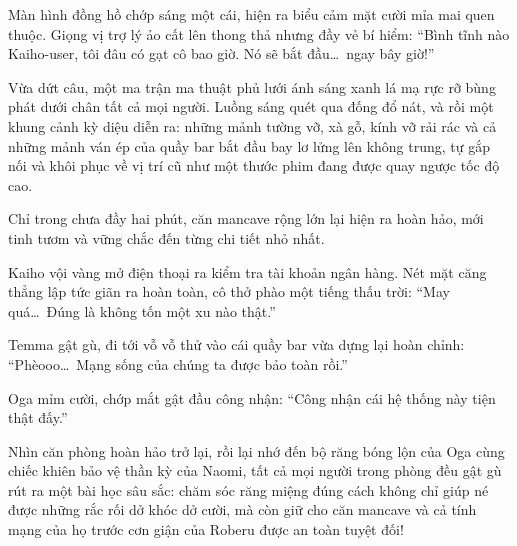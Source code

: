 \documentclass[../main.tex]{subfiles}
\begin{document}
Màn hình đồng hồ chớp sáng một cái, hiện ra biểu cảm mặt cười mỉa mai quen thuộc. Giọng vị trợ lý ảo cất lên thong thả nhưng đầy vẻ bí hiểm:
``Bình tĩnh nào Kaiho-user, tôi đâu có gạt cô bao giờ. Nó sẽ bắt đầu\dots\ ngay bây giờ!''

Vừa dứt câu, một ma trận ma thuật phủ lưới ánh sáng xanh lá mạ rực rỡ bùng phát dưới chân tất cả mọi người. Luồng sáng quét qua đống đổ nát, và rồi một khung cảnh kỳ diệu diễn ra: những mảnh tường vỡ, xà gỗ, kính vỡ rải rác và cả những mảnh ván ép của quầy bar bắt đầu bay lơ lửng lên không trung, tự gắp nối và khôi phục về vị trí cũ như một thước phim đang được quay ngược tốc độ cao.

Chỉ trong chưa đầy hai phút, căn mancave rộng lớn lại hiện ra hoàn hảo, mới tinh tươm và vững chắc đến từng chi tiết nhỏ nhất.

Kaiho vội vàng mở điện thoại ra kiểm tra tài khoản ngân hàng. Nét mặt căng thẳng lập tức giãn ra hoàn toàn, cô thở phào một tiếng thấu trời: ``May quá\dots\ Đúng là không tốn một xu nào thật.''

Temma gật gù, đi tới vỗ vỗ thử vào cái quầy bar vừa dựng lại hoàn chỉnh: ``Phèooo\dots\ Mạng sống của chúng ta được bảo toàn rồi.''

Oga mỉm cười, chớp mắt gật đầu công nhận: ``Công nhận cái hệ thống này tiện thật đấy.''

Nhìn căn phòng hoàn hảo trở lại, rồi lại nhớ đến bộ răng bóng lộn của Oga cùng chiếc khiên bảo vệ thần kỳ của Naomi, tất cả mọi người trong phòng đều gật gù rút ra một bài học sâu sắc: chăm sóc răng miệng đúng cách không chỉ giúp né được những rắc rối dở khóc dở cười, mà còn giữ cho căn mancave và cả tính mạng của họ trước cơn giận của Roberu được an toàn tuyệt đối!
\end{document}
